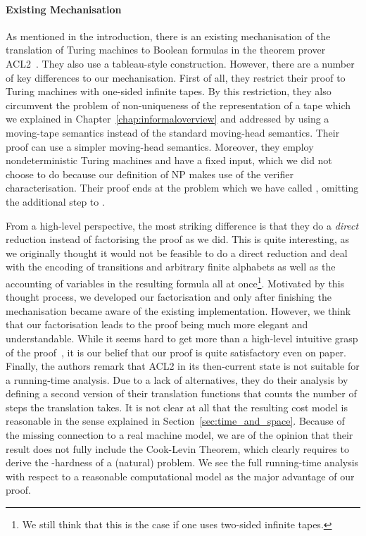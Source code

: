 \paragraph{Existing Mechanisation}
As mentioned in the introduction, there is an existing mechanisation of the translation of Turing machines to Boolean formulas in the theorem prover ACL2~\cite{gamboa:cook}. They also use a tableau-style construction. However, there are a number of key differences to our mechanisation.
First of all, they restrict their proof to Turing machines with one-sided infinite tapes. By this restriction, they also circumvent the problem of non-uniqueness of the representation of a tape which we explained in Chapter~\ref{chap:informaloverview} and addressed by using a moving-tape semantics instead of the standard moving-head semantics. Their proof can use a simpler moving-head semantics.
Moreover, they employ nondeterministic Turing machines and have a fixed input, which we did not choose to do because our definition of NP makes use of the verifier characterisation. Their proof ends at the problem which we have called \fsat{}, omitting the additional step to \sat{}.

From a high-level perspective, the most striking difference is that they do a \textit{direct} reduction instead of factorising the proof as we did. This is quite interesting, as we originally thought it would not be feasible to do a direct reduction and deal with the encoding of transitions and arbitrary finite alphabets as well as the accounting of variables in the resulting formula all at once\footnote{We still think that this is the case if one uses two-sided infinite tapes.}. Motivated by this thought process, we developed our factorisation and only after finishing the mechanisation became aware of the existing implementation.
However, we think that our factorisation leads to the proof being much more elegant and understandable. While it seems hard to get more than a high-level intuitive grasp of the proof~\cite{gamboa:cook}, it is our belief that our proof is quite satisfactory even on paper.
Finally, the authors remark that ACL2 in its then-current state is not suitable for a running-time analysis. Due to a lack of alternatives, they do their analysis by defining a second version of their translation functions that counts the number of steps the translation takes. It is not clear at all that the resulting cost model is reasonable in the sense explained in Section~\ref{sec:time_and_space}.
Because of the missing connection to a real machine model, we are of the opinion that their result does not fully include the Cook-Levin Theorem, which clearly requires to derive the \NP{}-hardness of a (natural) problem.
We see the full running-time analysis with respect to a reasonable computational model as the major advantage of our proof.

